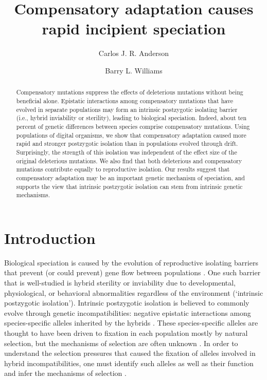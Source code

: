 \documentclass{article}
\title{Compensatory adaptation causes rapid incipient speciation}
\author{Carlos J. R. Anderson \and Barry L. Williams}
\begin{document}
\maketitle

\begin{abstract}
Compensatory mutations suppress the effects of deleterious mutations
without being beneficial alone.
%
Epistatic interactions among compensatory mutations that have
evolved in separate populations may form an intrinsic
postzygotic isolating barrier (i.e., hybrid inviability or sterility),
leading to biological speciation.
%
Indeed, about ten percent of genetic differences between species
comprise compensatory mutations.
%
Using populations of digital organisms, we show that
compensatory adaptation caused more rapid and stronger
postzygotic isolation than in
populations evolved through drift.
%
Surprisingly, the strength of this isolation was independent
of the effect size of the original deleterious mutations.
%
We also find that
both deleterious and compensatory mutations
contribute equally to reproductive isolation.
%
Our results suggest that compensatory adaptation may be
an important genetic mechanism of speciation,
and supports the view that intrinsic postzygotic isolation
can stem from intrinsic genetic mechanisms.
\end{abstract}



\section*{Introduction}

Biological speciation is caused by the evolution of reproductive isolating
barriers that prevent (or could prevent) gene flow between populations
\cite{coy04}.
%
One such barrier that is well-studied is hybrid sterility or inviability
due to developmental, physiological, or behavioral abnormalities
regardless of the environment (`intrinsic postzygotic isolation').
%
Intrinsic postzygotic isolation is believed to commonly evolve
through genetic incompatibilities: negative epistatic interactions
among species-specific alleles inherited by the hybrids \cite{pre10}.
%
These species-specific alleles are thought to have been driven to fixation
in each population mostly by natural selection,
but the mechanisms of selection are often unknown \cite{sch09}.
%
In order to understand the selection pressures that caused
the fixation of alleles involved in hybrid incompatibilities,
one must identify such alleles as well as their function
and infer the mechanisms of selection \cite{sch09,pre10,nos11}.
\end{document}
